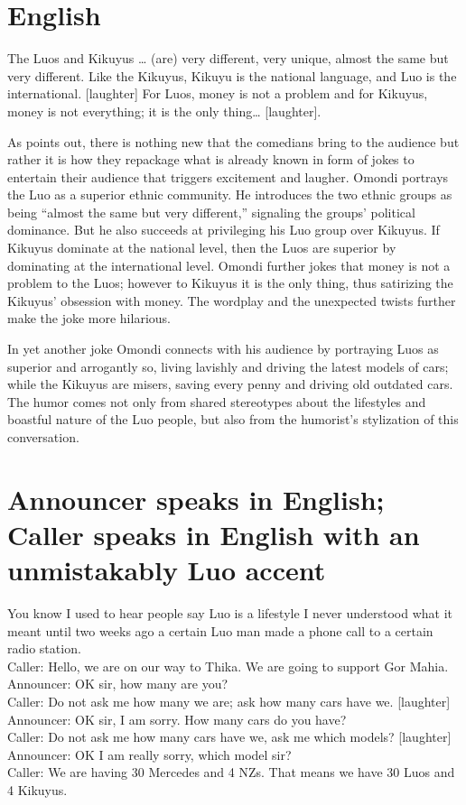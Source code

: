 \documentclass[output=paper]{langsci/langscibook}
\begin{document}
\chapter{English}
\gll The Luos and Kikuyus … (are) very different, very unique, almost the same but very different. Like the Kikuyus, Kikuyu is the national language, and Luo is the international.\textup{ [laughter]} For Luos, money is not a problem and for Kikuyus, money is not everything; it is the only thing… \textup{[laughter]. }\\
\glt \citep{Quarshe2015} 
\z

   As \citet{Apte1985} points out, there is nothing new that the comedians bring to the audience but rather it is how they repackage what is already known in form of jokes to entertain their audience that triggers excitement and laugher. Omondi portrays the Luo as a superior ethnic community. He introduces the two ethnic groups as being “almost the same but very different,” signaling the groups’ political dominance. But he also succeeds at privileging his Luo group over Kikuyus. If Kikuyus dominate at the national level, then the Luos are superior by dominating at the international level. Omondi further jokes that money is not a problem to the Luos; however to Kikuyus it is the only thing, thus satirizing the Kikuyus’ obsession with money. The wordplay and the unexpected twists further make the joke more hilarious. 

In yet another joke Omondi connects with his audience by portraying Luos  as superior and arrogantly so, living lavishly and driving the latest models of cars; while the Kikuyus are misers, saving every penny and driving old outdated cars. The humor comes not only from shared stereotypes about the lifestyles and boastful nature of the Luo people, but also from the humorist’s stylization of this conversation.

\chapter{Announcer speaks in English; Caller speaks in English with an unmistakably Luo accent}
\gll You know I used to hear people say Luo is a lifestyle I never understood what it meant until two weeks ago a certain Luo man made a phone call to a certain radio station. \\
\gll \textup{Caller}: Hello, we are on our way to Thika. We are going to support Gor Mahia. \\
\gll \textup{Announcer}: OK sir, how many are you?\\
\gll \textup{Caller}: Do not ask me how many we are; ask how many cars have we. \textup{[laughter]}\\
\gll \textup{Announcer}: OK sir, I am sorry. How many cars do you have?\\
\gll \textup{Caller}: Do not ask me how many cars have we, ask me which models? \textup{[laughter]}\\
\gll \textup{Announcer}: OK I am really sorry, which model sir?\\
\gll \textup{Caller}: We are having 30 Mercedes and 4 NZs. That means we have 30 Luos and 4 Kikuyus. \\
\glt \citep{Quarshe2015}
\z
\end{document}
